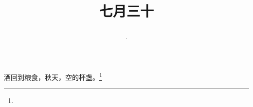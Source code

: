\title{\date[d=2,m=9,y=2024][year:cn-y,年,month:cn,day:cn,日,·,weekday]·七月三十 }
酒回到粮食，秋天，空的杯盏。\footnote{ }

